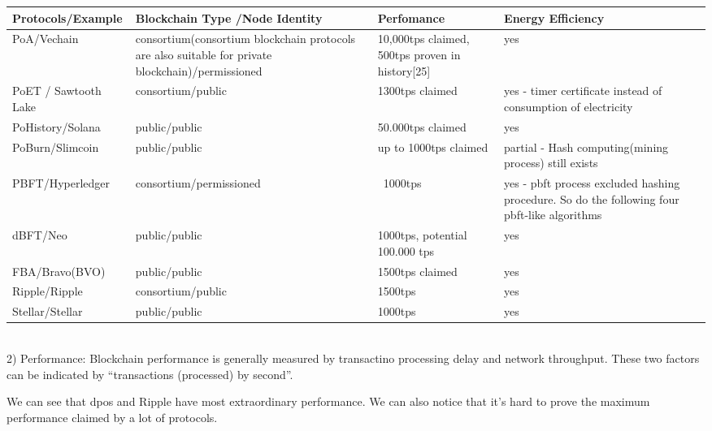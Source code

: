 \documentclass[doublespacing]{bmcart}
\begin{document}
\begin{CJK*}{UTF8}{gbsn}
\begin{tabular}{p{2cm}p{3cm}p{3cm}p{3cm}}
\hline
Protocols/E\-xample & Blockchain Type \newline /Node Identity & Perfo\-mance & Energy Efficiency \\ \hline
PoA/Vechain & consortium\newline(consortium blockchain protocols are also suitable for private blockchain)/permi\-ssioned & 10,000tps claimed, 500tps proven in history[25] & yes \\ \hline
PoET / Sawtooth Lake & consortium/public & 1300tps claimed & yes - timer certificate instead of consumption of electricity  \\ \hline
PoHistory/\newline Solana & public/public & 50.000tps claimed  & yes \\ \hline
PoBurn/\newline Slimcoin & public/public & up \newline to 1000tps claimed & partial - Hash computing(mining process) still exists  \\ \hline
PBFT/Hyp\-erledger & consortium/permi\-ssioned & ~1000tps & yes - pbft process excluded hashing procedure. So do the following four pbft-like algorithms  \\ \hline
dBFT/Neo & public/public & 1000tps, 
%
%
potential 100.000 tps & yes  \\ \hline
FBA/Bravo\newline(BVO) & public/public & 1500tps claimed & yes  \\ \hline
Ripple/Ripple & consortium/public & 1500tps & yes \\ \hline
Stellar/Stellar & public/public & 1000tps & yes \\ \hline
\end{tabular}\\



2) Performance: Blockchain performance is generally measured by transactino processing delay and network throughput. These two factors can be indicated by ``transactions (processed) by second''. 

We can see that dpos and Ripple have most extraordinary performance. We can also notice that it's hard to prove the maximum performance claimed by a lot of protocols. 


\end{CJK*}
\end{document}
